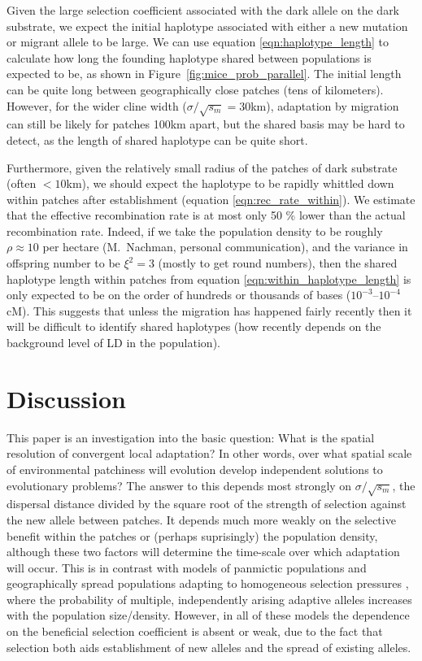 \documentclass{article}
\begin{document}
Given the large selection coefficient associated with the dark allele
on the dark substrate, we expect the initial haplotype associated with
either a new mutation or migrant allele to be large. 
We can use equation \eqref{eqn:haplotype_length} to calculate how long the founding
haplotype shared between populations is expected to be,
as shown in Figure~\ref{fig:mice_prob_parallel}. 
The initial length can be quite long between geographically close patches (tens of kilometers). 
However, for the wider cline width ($\sigma/\sqrt{s_m} = 30$km), 
adaptation by migration can still be likely for patches 100km apart, 
but the shared basis may be hard to detect, as the length of shared haplotype can be quite short. 

Furthermore, given the relatively small radius of the patches of dark substrate (often $<10$km),
we should expect the haplotype to be rapidly whittled down within
patches after establishment (equation \ref{eqn:rec_rate_within}). We
estimate that the effective recombination rate is at most only 50 \% lower
than the actual recombination rate.
Indeed, if we take the population density to be roughly $\rho \approx 10$ per hectare (M.~Nachman, personal communication),
and the variance in offspring number to be $\xi^2 = 3$ (mostly to get round numbers),
then the shared haplotype length within patches from equation \eqref{eqn:within_haplotype_length}
is only expected to be on the order of hundreds or thousands of bases
($10^{-3}$--$10^{-4}$cM).
This suggests that unless the migration has happened fairly recently
then it will be difficult to identify shared haplotypes
(how recently depends on the background level of LD in the population).


\section{Discussion} 
\label{ss:discussion}

This paper is an investigation into the basic question: 
What is the spatial resolution of convergent local adaptation?
In other words, 
over what spatial scale of environmental patchiness will evolution develop independent solutions to evolutionary problems?
The answer to this depends most strongly on $\sigma/\sqrt{s_m}$, 
the dispersal distance divided by the square root of the strength of selection
against the new allele between patches. It depends much more weakly on the
selective benefit within the patches or (perhaps suprisingly) the population density, 
although these two factors will determine the time-scale over which adaptation will occur. 
This is in contrast with models of panmictic populations \citep{softsweepsI} 
and geographically spread populations adapting to homogeneous selection pressures \citep{ralph2010parallel}, 
where the probability of multiple, independently arising adaptive alleles increases with the population size/density. 
However, in all of these models the dependence on the beneficial selection
coefficient is absent or weak, due to the fact that selection both
aids establishment of new alleles and the spread of existing
alleles. 
\end{document}
